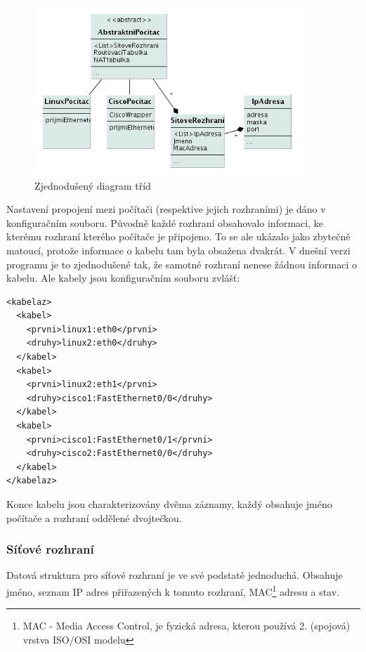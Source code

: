 
\begin{figure}[h]
\begin{center}
\includegraphics[width=10cm]{figures/uml_class}
\caption{Zjednodušený diagram tříd}
\label{uml:class}
\end{center}
\end{figure}

Nastavení propojení mezi počítači (respektive jejich rozhraními) je dáno v konfiguračním souboru. Původně každé rozhraní obsahovalo informaci, ke kterému rozhraní kterého počítače je připojeno. To se ale ukázalo jako zbytečně matoucí, protože informace o kabelu tam byla obsažena dvakrát. V dnešní verzi programu je to zjednodušené tak, že samotné rozhraní nenese žádnou informaci o kabelu. Ale kabely jsou konfiguračním souboru zvlášť:

\begin{verbatim}
<kabelaz>
  <kabel>
    <prvni>linux1:eth0</prvni>
    <druhy>linux2:eth0</druhy>
  </kabel>
  <kabel>
    <prvni>linux2:eth1</prvni>
    <druhy>cisco1:FastEthernet0/0</druhy>
  </kabel>
  <kabel>
    <prvni>cisco1:FastEthernet0/1</prvni>
    <druhy>cisco2:FastEthernet0/0</druhy>
  </kabel>
</kabelaz>
\end{verbatim} 

Konce kabelu jsou charakterizovány dvěma záznamy, každý obsahuje jméno počítače a rozhraní oddělené dvojtečkou.


\subsubsection{Síťové rozhraní}
Datová struktura pro síťové rozhraní je ve své podstatě jednoduchá. Obsahuje jméno, seznam IP adres přiřazených k tomuto rozhraní, MAC\footnote{MAC - Media Access Control, je fyzická adresa, kterou používá 2. (spojová) vrstva ISO/OSI modelu} adresu a stav.

